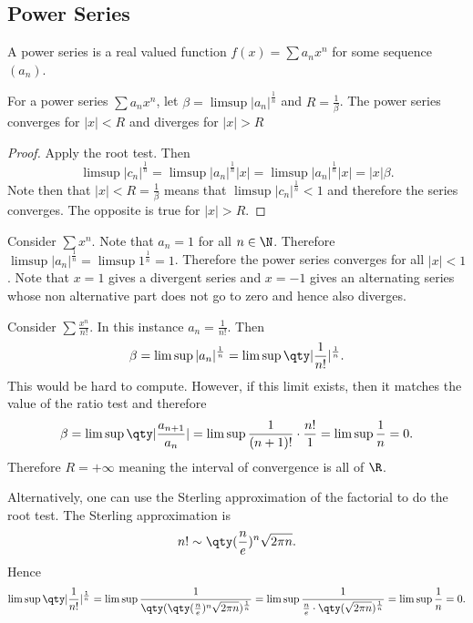 \documentclass[../notes.tex]{subfiles}
\begin{document}

\subsection{Power Series}

\begin{definition}
    A power series is a real valued function $f(x) = \sum a_n x^n$ for some sequence $(a_n)$.
\end{definition}

\begin{theorem}
    For a power series $\sum a_n x^n$, let $\beta = \limsup |a_n|^{\frac{1}{n}}$ and $R = \frac{1}{\beta}$. The power series converges for $|x| < R$ and diverges for $|x| > R$
\end{theorem}
\begin{proof}
    Apply the root test. Then
    \[
        \limsup |c_n|^{\frac{1}{n}} = \limsup |a_n|^{\frac{1}{n}} |x| = \limsup |a_n|^{\frac{1}{n}} |x| = |x| \beta
    .\]
    Note then that $|x| < R = \frac{1}{\beta}$ means that $\limsup |c_n|^{\frac{1}{n}} < 1$ and therefore the series converges. The opposite is true for $|x| > R$.
\end{proof}

\begin{example}
    Consider $\sum x^n$. Note that $a_n = 1$ for all $n \in \N$. Therefore $\limsup |a_n|^{\frac{1}{n}} = \limsup 1^{\frac{1}{n}} = 1$. Therefore the power series converges for all $|x| < 1$. Note that $x = 1$ gives a divergent series and $x = -1$ gives an alternating series whose non alternative part does not go to zero and hence also diverges.
\end{example}

\begin{example}
    Consider $\sum \frac{x^n}{n!}$. In this instance $a_n = \frac{1}{n!}$. Then
    \[
        \beta = \limsup |a_n|^{\frac{1}{n}} = \limsup \qty|\frac{1}{n!}|^{\frac{1}{n}}
    .\]
    This would be hard to compute. However, if this limit exists, then it matches the value of the ratio test and therefore
    \[
        \beta = \limsup \qty|\frac{a_{n+1}}{a_n}| = \limsup \frac{1}{(n+1)!} \cdot \frac{n!}{1} = \limsup \frac{1}{n} = 0
    .\]
    Therefore $R = +\infty$ meaning the interval of convergence is all of $\R$.
    \begin{remark}
        Alternatively, one can use the Sterling approximation of the factorial to do the root test. The Sterling approximation is
        \[
            n! \sim \qty(\frac{n}{e})^n \sqrt{2 \pi n}
        .\]
        Hence
        \[
            \limsup \qty|\frac{1}{n!}|^{\frac{1}{n}} = \limsup \frac{1}{\qty(\qty(\frac{n}{e})^n \sqrt{2 \pi n})^{\frac{1}{n}}} = \limsup \frac{1}{\frac{n}{e} \cdot \qty(\sqrt{2 \pi n})^{\frac{1}{n}}} = \limsup \frac{1}{n} = 0
        .\]
    \end{remark}
\end{example}
\end{document}
